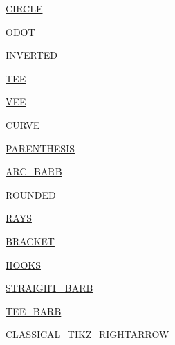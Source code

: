 \begin{DoxyCompactItemize}
\item 
\hyperlink{enumcom_1_1aarrelaakso_1_1drawl_1_1_arrowhead_1_1_type_aa798da36e5c99f20a9becce5adc4a8bd}{C\+I\+R\+C\+LE}
\item 
\hyperlink{enumcom_1_1aarrelaakso_1_1drawl_1_1_arrowhead_1_1_type_a70d3e12a9991fd0a941d9c25138476a7}{O\+D\+OT}
\item 
\hyperlink{enumcom_1_1aarrelaakso_1_1drawl_1_1_arrowhead_1_1_type_a47f58944f623a14d0f2b7ea990ba33c9}{I\+N\+V\+E\+R\+T\+ED}
\item 
\hyperlink{enumcom_1_1aarrelaakso_1_1drawl_1_1_arrowhead_1_1_type_a5820127f9ecd65921ffcfb02e2d2eb08}{T\+EE}
\item 
\hyperlink{enumcom_1_1aarrelaakso_1_1drawl_1_1_arrowhead_1_1_type_a8301a8818926413534a5604df1e91dac}{V\+EE}
\item 
\hyperlink{enumcom_1_1aarrelaakso_1_1drawl_1_1_arrowhead_1_1_type_acf2cc415237f597e19ef2cbca0059cbb}{C\+U\+R\+VE}
\item 
\hyperlink{enumcom_1_1aarrelaakso_1_1drawl_1_1_arrowhead_1_1_type_a9de2bdf02534510c099f856ded0500e3}{P\+A\+R\+E\+N\+T\+H\+E\+S\+IS}
\item 
\hyperlink{enumcom_1_1aarrelaakso_1_1drawl_1_1_arrowhead_1_1_type_ab1a7fc7ccf7d089ac3b9b542d5658a7d}{A\+R\+C\+\_\+\+B\+A\+RB}
\item 
\hyperlink{enumcom_1_1aarrelaakso_1_1drawl_1_1_arrowhead_1_1_type_a44ab18e4cfb9887938af1017cb7db82f}{R\+O\+U\+N\+D\+ED}
\item 
\hyperlink{enumcom_1_1aarrelaakso_1_1drawl_1_1_arrowhead_1_1_type_a586dd8decad3018c6d7c69b98aa2fee5}{R\+A\+YS}
\item 
\hyperlink{enumcom_1_1aarrelaakso_1_1drawl_1_1_arrowhead_1_1_type_a1752cfa6d6458e674f51b591c1f13982}{B\+R\+A\+C\+K\+ET}
\item 
\hyperlink{enumcom_1_1aarrelaakso_1_1drawl_1_1_arrowhead_1_1_type_ac7785804ee71d88f541c4aab8b1c7855}{H\+O\+O\+KS}
\item 
\hyperlink{enumcom_1_1aarrelaakso_1_1drawl_1_1_arrowhead_1_1_type_a7500173be6145013e3c1d5aa7068b431}{S\+T\+R\+A\+I\+G\+H\+T\+\_\+\+B\+A\+RB}
\item 
\hyperlink{enumcom_1_1aarrelaakso_1_1drawl_1_1_arrowhead_1_1_type_a80a60c14eb16a71b758fd9cfc81e2952}{T\+E\+E\+\_\+\+B\+A\+RB}
\item 
\hyperlink{enumcom_1_1aarrelaakso_1_1drawl_1_1_arrowhead_1_1_type_a7d11f7c30dc23c5697f520b5e1230efe}{C\+L\+A\+S\+S\+I\+C\+A\+L\+\_\+\+T\+I\+K\+Z\+\_\+\+R\+I\+G\+H\+T\+A\+R\+R\+OW}
\item 

\end{DoxyCompactItemize}
